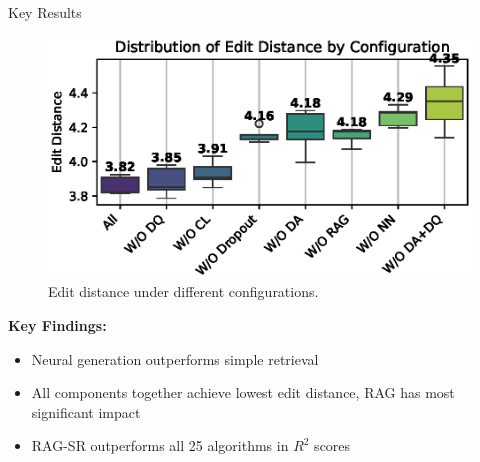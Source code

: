 \documentclass[final]{beamer}
\newcommand{\hlblue}[1]{\textcolor{mainblue}{#1}}
\newcommand{\hlpurple}[1]{\textcolor{deepplum}{#1}}
\newcommand{\hlorange}[1]{\textcolor{warmorange}{#1}}
\newcommand{\hlcharred}[1]{\textcolor{charredred}{#1}}
\newlength{\onecolwid}
\begin{document}
\begin{frame}[t]
\begin{columns}[t]
\begin{column}{\onecolwid}
\begin{block}{Key Results}
                    \begin{minipage}[t]{0.48\linewidth}
                        \begin{figure}
                            \centering
                            \includegraphics[width=\linewidth]{figs/ablation_study_accuracy_10.eps}
                            \caption{Edit distance under different configurations.}
                        \end{figure}
                    \end{minipage}
                    \hfill
                    \begin{minipage}[t]{0.48\linewidth}
                        \vspace*{.5cm} %
                        \textbf{\hlblue{Key Findings:}}
                        \begin{itemize}
                            \item \hlpurple{Neural generation outperforms simple retrieval}
                            \item \hlcharred{All components together achieve lowest edit distance, RAG has most significant impact}
                            \item \hlorange{RAG-SR outperforms all 25 algorithms in $R^2$ scores}
                        \end{itemize}
                    \end{minipage}

                    \vspace{45mm}


\end{block}
\end{column}
\end{columns}
\end{frame}
\end{document}
